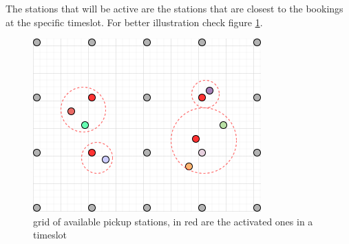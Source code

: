 \documentclass{article}
\begin{document}
The stations that will be active are the stations that are closest to the bookings at the specific timeslot. For better illustration check figure \ref{fig:pickup_stations}.

\begin{figure}[H]
    \centering 
  \includegraphics[width=0.5\linewidth]{pictures/pickup_stations}
  \caption{grid of available pickup stations, in red are the activated ones in a timeslot}
\label{fig:pickup_stations}
\end{figure}







\end{document}
